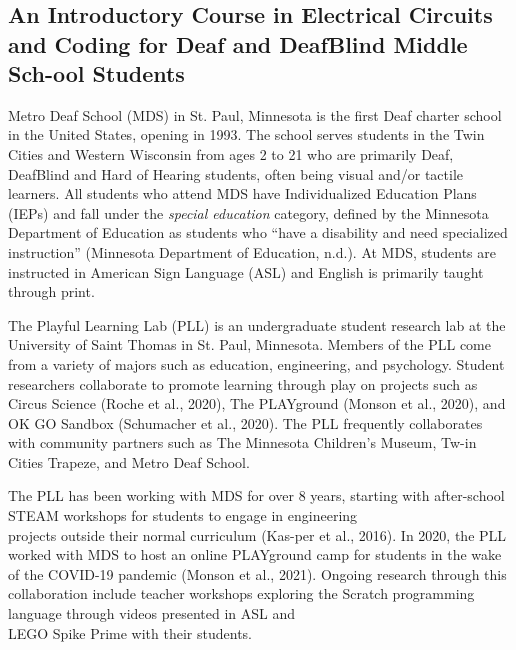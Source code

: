 \documentclass[11.5pt]{sig-alternate}
\begin{document}
\vspace{5mm}
\section*{\vspace{140mm}}
\begin{large}
    \section*{An Introductory Course in Electrical Circuits and Coding for Deaf and DeafBlind Middle Sch-ool Students}
Metro Deaf School (MDS) in St. Paul, Minnesota is the first Deaf charter school in the United States, opening in 1993. The school serves students in the Twin Cities and Western Wisconsin from ages 2 to 21 who are primarily Deaf, DeafBlind and Hard of Hearing students, often being visual and/or tactile learners. All students who attend MDS have Individualized Education Plans (IEPs) and fall under the \textit{special education} category, defined by the Minnesota Department of Education as students who “have a disability and need specialized instruction” (Minnesota Department of Education, n.d.). At MDS, students are instructed in American Sign Language (ASL) and English is primarily taught through print.

The Playful Learning Lab (PLL) is an undergraduate student research lab at the University of Saint Thomas in St. Paul, Minnesota. Members of the PLL come from a variety of majors such as education, engineering, and psychology. Student researchers collaborate to promote learning through play on projects such as Circus Science (Roche et al., 2020), The PLAYground (Monson et al., 2020), and OK GO Sandbox (Schumacher et al., 2020). The PLL frequently collaborates with community partners such as The Minnesota Children’s Museum, Tw-in Cities Trapeze, and Metro Deaf School.

The PLL has been working with MDS for over 8 years, starting with after-school STEAM workshops for students to engage in engineering \\ projects outside their normal curriculum (Kas-per et al., 2016). In 2020, the PLL worked with MDS to host an online PLAYground camp for students in the wake of the COVID-19 pandemic (Monson et al., 2021). Ongoing research through this collaboration include teacher workshops exploring the Scratch programming language through videos presented in ASL and \\ LEGO Spike Prime with their students.


\end{large}
\end{document}
